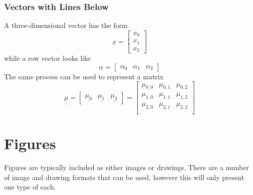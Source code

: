 \subsubsection{Vectors with Lines Below}
    A three-dimensional vector has the form
    \begin{equation}
        \underline{x}
            =\begin{bmatrix}
                x_0 \\ x_1 \\ x_2
             \end{bmatrix}
    \end{equation}
    while a row vector looks like
    \begin{equation}
        \underline{\alpha}
            =\begin{bmatrix}
                \alpha_0 & \alpha_1 & \alpha_2
             \end{bmatrix}
    \end{equation}
    The same process can be used to represent a matrix
    \begin{equation}
        \underline{\underline{\mu}}
            =\begin{bmatrix}
                \underline{\mu_0} & \underline{\mu_1} & \underline{\mu_2}
             \end{bmatrix}
            =\begin{bmatrix}
                \mu_{0,0} & \mu_{0,1} & \mu_{0,2} \\
                \mu_{1,0} & \mu_{1,1} & \mu_{1,2} \\
                \mu_{2,0} & \mu_{2,1} & \mu_{2,2} \\
             \end{bmatrix}
    \end{equation}

\section{Figures} \label{sec:Figures}
    Figures are typically included as either images or drawings.
    There are a number of image and drawing formats that can be used, however this will only present one type of each.

